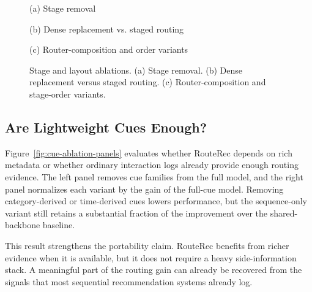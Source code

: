 \documentclass[sigconf,review,anonymous]{acmart}
\newcommand{\placeholderpanel}[1]{\fbox{\rule{0pt}{#1}\rule{0.92\linewidth}{0pt}}}
\begin{document}
\begin{figure}[!t]
  \centering
  \begin{minipage}[t]{0.31\textwidth}
    \centering
    \placeholderpanel{1.05in}

    \vspace{0.35em}
    {\footnotesize (a) Stage removal}
  \end{minipage}\hfill
  \begin{minipage}[t]{0.31\textwidth}
    \centering
    \placeholderpanel{1.05in}

    \vspace{0.35em}
    {\footnotesize (b) Dense replacement vs. staged routing}
  \end{minipage}\hfill
  \begin{minipage}[t]{0.31\textwidth}
    \centering
    \placeholderpanel{1.05in}

    \vspace{0.35em}
    {\footnotesize (c) Router-composition and order variants}
  \end{minipage}
  \caption{Stage and layout ablations. (a) Stage removal. (b) Dense replacement versus staged routing. (c) Router-composition and stage-order variants.}
  \label{fig:stage-structure-panels}
\end{figure}

\subsection{Are Lightweight Cues Enough?}
\label{sec:lightweight-cues}
Figure~\ref{fig:cue-ablation-panels} evaluates whether RouteRec depends on rich metadata or whether ordinary interaction logs already provide enough routing evidence. The left panel removes cue families from the full model, and the right panel normalizes each variant by the gain of the full-cue model. Removing category-derived or time-derived cues lowers performance, but the sequence-only variant still retains a substantial fraction of the improvement over the shared-backbone baseline.

This result strengthens the portability claim. RouteRec benefits from richer evidence when it is available, but it does not require a heavy side-information stack. A meaningful part of the routing gain can already be recovered from the signals that most sequential recommendation systems already log.
\end{document}
